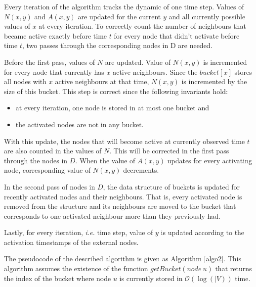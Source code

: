 \documentclass[times, utf8, zavrsni]{fer}
\begin{document}
Every iteration of the algorithm tracks the dynamic of one time step. Values of $N(x,y)$ and $A(x,y)$ are updated for the current $y$ and all currently possible values of $x$ at every iteration. To correctly count the number of neighbours that became active exactly before time $t$ for every node  that didn't activate before time $t$, two passes through the corresponding nodes in D are needed.

Before the first pass, values of $N$ are updated. Value of $N(x,y)$ is incremented for every node that currently has $x$ active neighbours. Since the $bucket[x]$ stores all nodes with $x$ active neighbours at that time, $N(x,y)$ is incremented by the size of this bucket. This step is correct since the following invariants hold:
\begin{itemize}
\item{at every iteration, one node  is stored in at most one bucket and }
\item{the activated nodes are not in any bucket.}
\end{itemize} 

With this update, the nodes that will become active at currently observed time $t$ are also counted in the values of $N$. This will be corrected in the first pass through the nodes in $D$. When the value of $A(x,y)$ updates for every activating node, corresponding value of $N(x,y)$ decrements. 

In the second pass of nodes in $D$, the data structure of buckets is updated for recently activated nodes and their neighbours. That is, every activated node is removed from the structure and its neighbours are moved to the bucket that corresponds to  one activated neighbour more than they previously had.

Lastly, for every iteration, \emph{i.e.} time step, value of $y$ is updated according to the activation timestamps of the external nodes.

The pseudocode of the described algorithm is given as Algorithm \ref{algo2}. This algorithm assumes the existence of the function $getBucket(node\: u)$ that returns the index of the bucket where node $u$ is currently stored in $\mathcal{O}(\log(|V))$ time.
\end{document}
